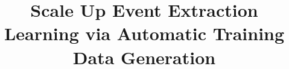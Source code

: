 \documentclass[letterpaper]{article} %
\begin{document}
%
\author{}
\title{Scale Up Event Extraction Learning via Automatic Training Data Generation}

\maketitle











\end{document}
